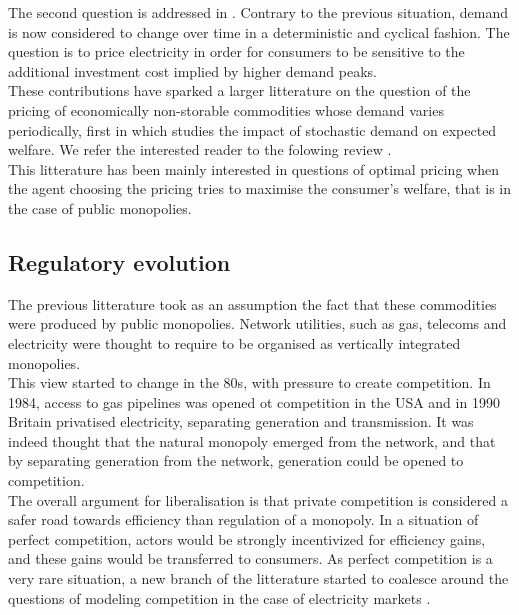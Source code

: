 The second question is addressed in \cite{boiteux1960peak}. Contrary to the previous situation, demand is now considered to change over time in a deterministic and cyclical fashion. The question is to price electricity in order for consumers to be sensitive to the additional investment cost implied by higher demand peaks. \\

These contributions have sparked a larger litterature on the question of the pricing of economically non-storable commodities whose demand varies periodically, first in \cite{brown1969public} which studies the impact of stochastic demand on expected welfare. We refer the interested reader to the folowing review \cite{crew1995theory}. \\ 

This litterature has been mainly interested in questions of optimal pricing when the agent choosing the pricing tries to maximise the consumer's welfare, that is in the case of public monopolies. \\

\subsection*{Regulatory evolution}
The previous litterature took as an assumption the fact that these commodities were produced by public monopolies. Network utilities, such as gas, telecoms and electricity were thought to require to be organised as vertically integrated monopolies. \\

This view started to change in the 80s, with pressure to create competition. In 1984, access to gas pipelines was opened ot competition in the USA and in 1990 Britain privatised electricity, separating generation and transmission. It was indeed thought that the natural monopoly emerged from the network, and that by separating generation from the network, generation could be opened to competition. \\

The overall argument for liberalisation is that private competition is considered a safer road towards efficiency than regulation of a monopoly. In a situation of perfect competition, actors would be strongly incentivized for efficiency gains, and these gains would be transferred to consumers. As perfect competition is a very rare situation, a new branch of the litterature started to coalesce around the questions of modeling competition in the case of electricity markets \cite{newbery1997privatisation}. \\


